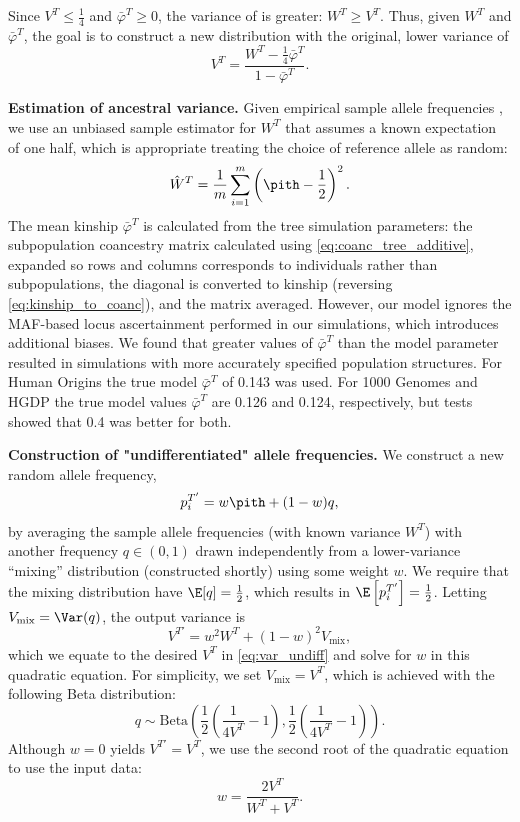 \documentclass[11pt]{article}
\begin{document}
Since $V^T \le \frac{1}{4}$ and $\bar{\varphi}^T \ge 0$, the variance of \pith is greater: $W^T \ge V^T$.
Thus, given $W^T$ and $\bar{\varphi}^T$, the goal is to construct a new distribution with the original, lower variance of
\begin{equation}
  \label{eq:var_undiff}
  V^T
  =
  \frac{ W^T - \frac{1}{4} \bar{\varphi}^T }{ 1 - \bar{\varphi}^T }
  .
\end{equation}

\textbf{Estimation of ancestral variance.}
Given empirical sample allele frequencies \pith, we use an unbiased sample estimator for $W^T$ that assumes a known expectation of one half, which is appropriate treating the choice of reference allele as random:
$$
\hat{W}^T
=
\frac{1}{m} \sum_{i=1}^m \left( \pith - \frac{1}{2} \right)^2
.
$$
The mean kinship $\bar{\varphi}^T$ is calculated from the tree simulation parameters: the subpopulation coancestry matrix calculated using \cref{eq:coanc_tree_additive}, expanded so rows and columns corresponds to individuals rather than subpopulations, the diagonal is converted to kinship (reversing \cref{eq:kinship_to_coanc}), and the matrix averaged.
However, our model ignores the MAF-based locus ascertainment performed in our simulations, which introduces additional biases.
We found that greater values of $\bar{\varphi}^T$ than the model parameter resulted in simulations with more accurately specified population structures.
For Human Origins the true model $\bar{\varphi}^T$ of 0.143 was used.
For 1000 Genomes and HGDP the true model values $\bar{\varphi}^T$ are 0.126 and 0.124, respectively, but tests showed that 0.4 was better for both.

\textbf{Construction of "undifferentiated" allele frequencies.}
We construct a new random allele frequency,
$$
p_i^{T'} = w \pith + ( 1 - w ) q,
$$
by averaging the sample allele frequencies \pith (with known variance $W^T$) with another frequency $q \in (0, 1)$ drawn independently from a lower-variance ``mixing'' distribution (constructed shortly) using some weight $w$.
We require that the mixing distribution have $\E[q] = \frac{1}{2}$, which results in $\E \left[ p_i^{T'} \right] = \frac{1}{2}$.
Letting $V_\text{mix} = \Var(q)$, the output variance is
$$
V^{T'}
=
w^2 W^T + (1-w)^2 V_\text{mix}
,
$$
which we equate to the desired $V^T$ in \cref{eq:var_undiff} and solve for $w$ in this quadratic equation.
For simplicity, we set $V_\text{mix} = V^T$, which is achieved with the following Beta distribution:
$$
q \sim \text{Beta} \left( \frac{1}{2} \left( \frac{1}{ 4 V^T } - 1 \right), \frac{1}{2} \left( \frac{1}{ 4 V^T } - 1 \right) \right)
.
$$
Although $w=0$ yields $V^{T'} = V^T$, we use the second root of the quadratic equation to use the input \pith data:
$$
w = \frac{ 2 V^T }{ W^T + V^T }.
$$
\end{document}
